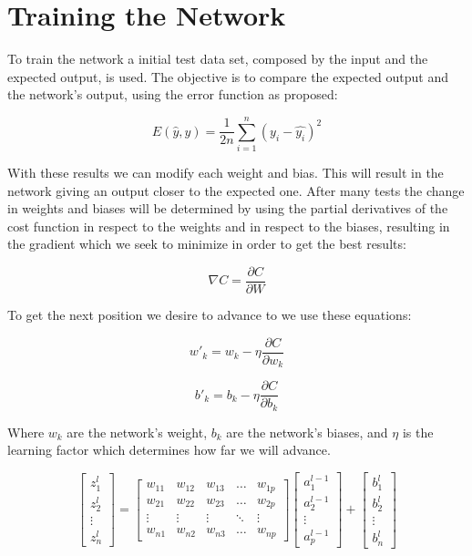 \documentclass[a4paper, 12pts]{amsart}
\begin{document}
\section{Training the Network}
To train the network a initial test data set, composed by the input and the expected output, is used. The objective is to compare the expected output and the network's output, using the error function as proposed:

\[E(\hat{y}, y) = \frac{1}{2n}\sum_{i=1}^{n} (y_i-\hat{y_i})^2\]


With these results we can modify each weight and bias. This will result in the network giving an output closer to the expected one. After many tests the change in weights and biases will be determined by using the partial derivatives of the cost function in respect to the weights and in respect to the biases, resulting in the gradient which we seek to minimize in order to get the best results:

\[\nabla C = \frac{\partial C}{\partial W}\]

To get the next position we desire to advance to we use these equations:

\[ w'_k = w_k - \eta\frac{\partial C}{\partial w_k}\]


\[b'_k = b_k - \eta\frac{\partial C}{\partial b_k}\]

Where $w_k$ are the network's weight, $b_k$ are the network's biases, and $\eta$ is the learning factor which determines how far we will advance.


\[
  \begin{bmatrix}
    z_{1}^{l}\\
    z_{2}^{l}\\
    \vdots\\
    z_{n}^{l}
  \end{bmatrix}
   =
   \begin{bmatrix}
    w_{11} & w_{12} & w_{13} & \dots  & w_{1p} \\
    w_{21} & w_{22} & w_{23} & \dots  & w_{2p} \\
    \vdots & \vdots & \vdots & \ddots & \vdots \\
    w_{n1} & w_{n2} & w_{n3} & \dots  & w_{np}
\end{bmatrix}
   \begin{bmatrix}
    a_{1}^{l-1}\\
    a_{2}^{l-1}\\
    \vdots\\
    a_{p}^{l-1}
  \end{bmatrix}
  +
  \begin{bmatrix}
    b_{1}^{l}\\
    b_{2}^{l}\\
    \vdots\\
    b_{n}^{l}
  \end{bmatrix}
\]
\end{document}

